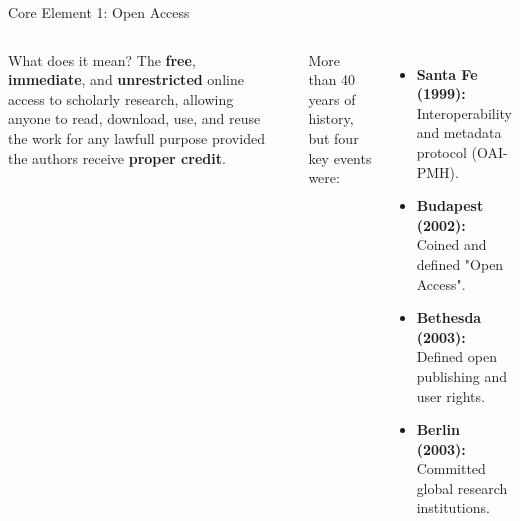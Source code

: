 \documentclass[aspectratio=169]{beamer}
\begin{document}
\begin{frame}{Core Element 1: Open Access}
  \begin{columns}[T,onlytextwidth]
      \begin{block}{What does it mean?}
        The \textbf{free}, \textbf{immediate}, and \textbf{unrestricted} online access to scholarly research, allowing anyone to read, download, use, and reuse the work for any lawfull purpose provided the authors receive \textbf{proper credit}.
      \end{block}
      
      \vspace{1em}
      \begin{cookiecard}[title=Traditional vs. Open]
        \centering
        \vspace{0.5em}
        \vspace{0.2em}
      \end{cookiecard}

      \vspace{.5em}
      
      More than 40 years of history, but four key events were:
      \vspace{.5em}
      
      \begin{itemize}
        \item \textbf{Santa Fe (1999):} Interoperability and metadata protocol (OAI-PMH).
        \item \textbf{Budapest (2002):} Coined and defined "Open Access".
        \item \textbf{Bethesda (2003):} Defined open publishing and user rights.
        \item \textbf{Berlin (2003):} Committed global research institutions.
      \end{itemize}
  \end{columns}
\end{frame}
\end{document}
